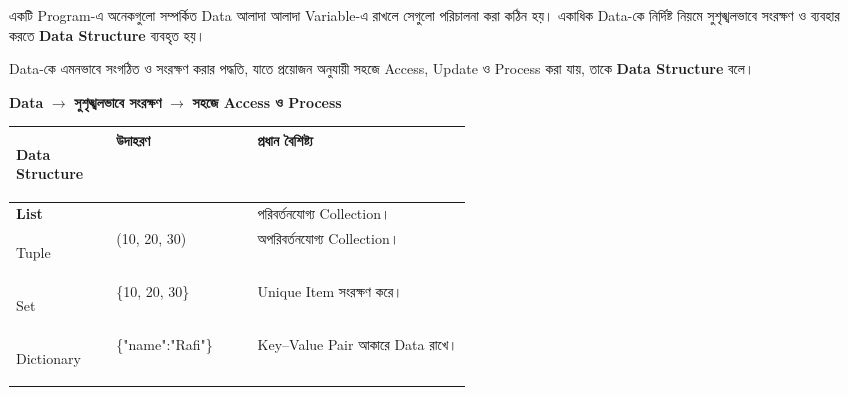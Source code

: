 
একটি Program-এ অনেকগুলো সম্পর্কিত Data আলাদা আলাদা Variable-এ রাখলে
সেগুলো পরিচালনা করা কঠিন হয়। একাধিক Data-কে নির্দিষ্ট নিয়মে
সুশৃঙ্খলভাবে সংরক্ষণ ও ব্যবহার করতে \textbf{Data Structure} ব্যবহৃত হয়।



\begin{definitionbox}

Data-কে এমনভাবে সংগঠিত ও সংরক্ষণ করার পদ্ধতি, যাতে প্রয়োজন অনুযায়ী
সহজে Access, Update ও Process করা যায়, তাকে
\textbf{Data Structure} বলে।

\end{definitionbox}

\begin{center}

\textbf{Data}
\(\longrightarrow\)
\textbf{সুশৃঙ্খলভাবে সংরক্ষণ}
\(\longrightarrow\)
\textbf{সহজে Access ও Process}

\end{center}



\begin{tabularx}
{\linewidth}
{
|>{\bfseries\RaggedRight\arraybackslash}p{0.22\linewidth}
|>{\RaggedRight\arraybackslash}p{0.31\linewidth}
|Y|
}

\hline
{}

\textbf{Data Structure}
&
\textbf{উদাহরণ}
&
\textbf{প্রধান বৈশিষ্ট্য}
\\
\hline

List
&
\textenglish{\ttfamily [10, 20, 30]}
&
পরিবর্তনযোগ্য Collection।
\\
\hline

Tuple
&
\textenglish{\ttfamily (10, 20, 30)}
&
অপরিবর্তনযোগ্য Collection।
\\
\hline

Set
&
\textenglish{\ttfamily \{10, 20, 30\}}
&
Unique Item সংরক্ষণ করে।
\\
\hline

Dictionary
&
\textenglish{\ttfamily \{"name":"Rafi"\}}
&
Key--Value Pair আকারে Data রাখে।
\\
\hline

\end{tabularx}

